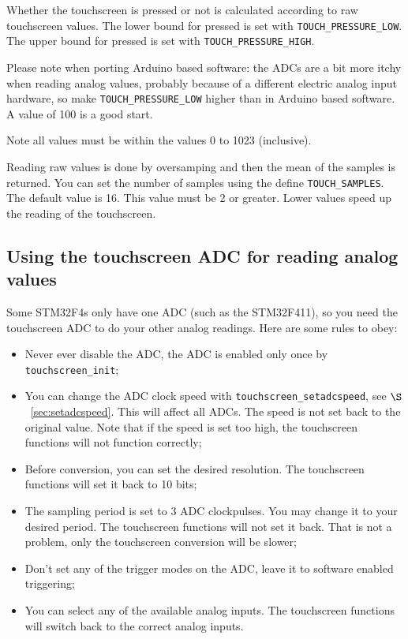 \documentclass[12pt]{article}
\begin{document}
Whether the touchscreen is pressed or not is calculated according to raw touchscreen values. The lower bound for pressed is set with \lstinline|TOUCH_PRESSURE_LOW|. The upper bound for pressed is set with \lstinline|TOUCH_PRESSURE_HIGH|.

Please note when porting Arduino based software: the ADCs are a bit more itchy when reading analog values, probably because of a different electric analog input hardware, so make \lstinline|TOUCH_PRESSURE_LOW| higher than in Arduino based software. A value of 100 is a good start.

Note all values must be within the values 0 to 1023 (inclusive).

Reading raw values is done by oversamping and then the mean of the samples is returned. You can set the number of samples using the define \lstinline|TOUCH_SAMPLES|. The default value is 16. This value must be 2 or greater. Lower values speed up the reading of the touchscreen.

\subsection{Using the touchscreen ADC for reading analog values}
Some STM32F4s only have one ADC (such as the STM32F411), so you need the touchscreen ADC to do your other analog readings. Here are some rules to obey:

\begin{itemize}
\item Never ever disable the ADC, the ADC is enabled only once by \lstinline|touchscreen_init|;
\item You can change the ADC clock speed with \lstinline|touchscreen_setadcspeed|, see $\S$~\ref{sec:setadcspeed}. This will affect all ADCs. The speed is not set back to the original value. Note that if the speed is set too high, the touchscreen functions will not function correctly;
\item Before conversion, you can set the desired resolution. The touchscreen functions will set it back to 10 bits;
\item The sampling period is set to 3 ADC clockpulses. You may change it to your desired period. The touchscreen functions will not set it back. That is not a problem, only the touchscreen conversion will be slower;
\item Don't set any of the trigger modes on the ADC, leave it to software enabled triggering;
\item You can select any of the available analog inputs. The touchscreen functions will switch back to the correct analog inputs. 
\end{itemize}
\end{document}
